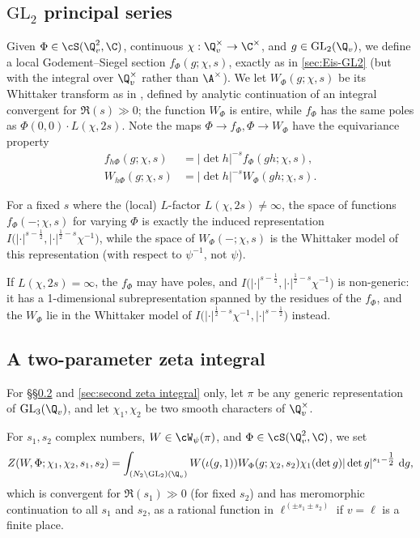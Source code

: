 \documentclass[10pt,reqno,a4paper]{amsart}
\newcommand{\GL}{\mathrm{GL}}
\begin{document}
\subsection{\texorpdfstring{$\GL_2$}{GL(2)} principal series}
Given $\Phi \in \cS(\Q_v^2,\C)$, continuous $\chi : \Q_v^\times \to \C^\times$, and $g \in \GL_2(\Q_v)$, we define a local Godement--Siegel section $f_\Phi(g;\chi,s)$, exactly as in \cref{sec:Eis-GL2} (but with the integral over $\Q_v^\times$ rather than $\A^\times$). We let $W_\Phi(g;\chi,s)$ be its Whittaker transform as in \cite[\S 8.1]{LPSZ19}, defined by analytic continuation of an integral convergent for $\Re(s) \gg 0$; the function $W_{\Phi}$ is entire, while $f_{\Phi}$ has the same poles as $\Phi(0, 0) \cdot L(\chi, 2s)$.
Note the maps $\Phi \to f_{\Phi}, \Phi \to W_\Phi$ have the equivariance property
\begin{align*}
f_{h\Phi}(g; \chi, s) &= |\det h|^{-s} f_{\Phi}(gh; \chi, s),\\
W_{h\Phi}(g; \chi, s) &= |\det h|^{-s} W_{\Phi}(gh; \chi, s).
\end{align*}


For a fixed $s$ where the (local) $L$-factor $L(\chi, 2s) \ne \infty$, the space of functions $f_{\Phi}(-; \chi, s)$ for varying $\Phi$ is exactly the induced representation $I\big(|\cdot|^{s-\tfrac{1}{2}}, |\cdot|^{\tfrac{1}{2}-s}\chi^{-1}\big)$, while the space of $W_{\Phi}(-; \chi, s)$ is the Whittaker model of this representation (with respect to $\psi^{-1}$, not $\psi$).

If $L(\chi, 2s) = \infty$, the $f_{\Phi}$ may have poles, and $I\big(|\cdot|^{s-\tfrac{1}{2}}, |\cdot|^{\tfrac{1}{2}-s}\chi^{-1}\big)$ is non-generic: it has a 1-dimensional subrepresentation spanned by the residues of the $f_{\Phi}$, and the $W_{\Phi}$ lie in the Whittaker model of $I\big( |\cdot|^{\tfrac{1}{2}-s}\chi^{-1}, |\cdot|^{s-\tfrac{1}{2}}\big)$ instead.

\subsection{A two-parameter zeta integral}\label{sec:two-parameter}

For \S\S\ref{sec:two-parameter} and \ref{sec:second zeta integral} only, let $\pi$ be any generic representation of $\GL_3(\Q_v)$, and let $\chi_1, \chi_2$ be two smooth characters of $\Q_v^\times$.

\begin{definition}\label{def:local zeta Z}
For $s_1, s_2$ complex numbers, $W \in \cW_{\psi}(\pi)$, and $\Phi \in \cS(\Q_v^2,\C)$, we set
\[Z(W, \Phi; \chi_1, \chi_2, s_1, s_2) = 
	\int_{(N_2 \backslash \GL_2)(\Q_v) } W(\iota(g, 1)) W_{\Phi}(g; \chi_2, s_2) \chi_1(\det g)|\det g|^{s_1 - \tfrac{1}{2}}\ \mathrm{d}g,
\]
which is convergent for $\Re(s_1) \gg 0$ (for fixed $s_2$) and has meromorphic continuation to all $s_1$ and $s_2$, as a rational function in $\ell^{(\pm s_1 \pm s_2)}$ if $v = \ell$ is a finite place.
\end{definition}
\end{document}
